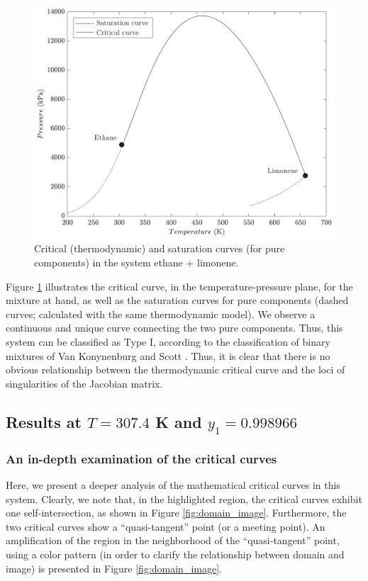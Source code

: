 \documentclass[journal=iecred,manuscript=article]{achemso}
\theoremstyle{definition}
\theoremstyle{remark}
\begin{document}
\begin{figure}
	\begin{center}
		\includegraphics[scale=0.50]{curva_critica_saturacao.pdf}
		\caption{Critical (thermodynamic) and saturation curves (for pure components) in the system ethane + limonene.}\label{fig:critical_thermo}
	\end{center}
\end{figure}

Figure \ref{fig:critical_thermo} illustrates the critical curve, in the temperature-pressure plane, for the mixture at hand, as well as the saturation curves for pure components (dashed curves; calculated with the same thermodynamic model). We observe a continuous and unique curve connecting the two pure components. Thus, this system can be classified as Type I, according to the classification of binary mixtures of Van Konynenburg and Scott \cite{classif}. Thus, it is clear that there is no obvious relationship between the thermodynamic critical curve and the loci of singularities of the Jacobian matrix.

\subsection{Results at $T = 307.4 $ K and $y_1 = 0.998966$}

\subsubsection{An in-depth examination of the critical curves}

Here, we present a deeper analysis of the mathematical critical curves in this system. Clearly, we note that, in the highlighted region, the critical curves exhibit one self-intersection, as shown in Figure \ref{fig:domain_image}. Furthermore, the two critical curves show a \enquote{quasi-tangent} point (or a meeting point). An amplification of the region in the neighborhood of the \enquote{quasi-tangent} point, using a color pattern (in order to clarify the relationship between domain and image) is presented in Figure \ref{fig:domain_image}.
\end{document}

